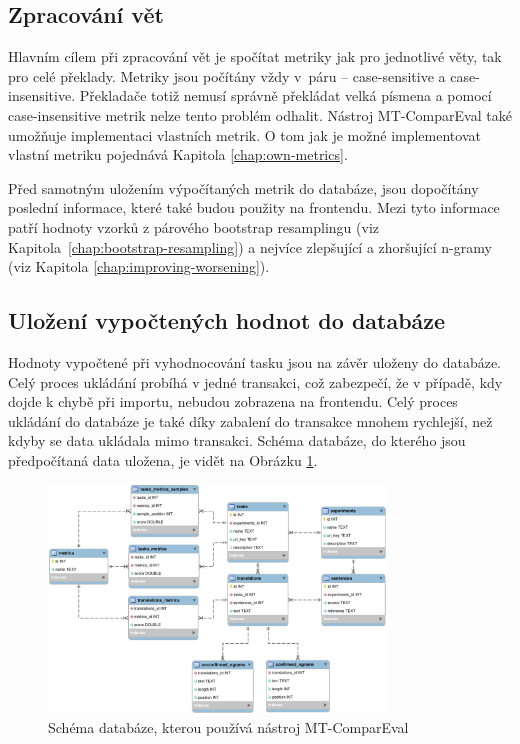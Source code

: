 \subsection{Zpracování vět}
Hlavním cílem při zpracování vět je spočítat metriky jak pro jednotlivé věty,
  tak pro celé překlady.
Metriky jsou počítány vždy v~páru -- \mbox{case-sensitive} a \mbox{case-insensitive}.
Překladače totiž nemusí správně překládat velká písmena
  a pomocí \mbox{case-insensitive} metrik nelze tento problém odhalit.
Nástroj \mbox{MT-ComparEval} také umožňuje implementaci vlastních metrik.
O tom jak je možné implementovat vlastní metriku pojednává Kapitola \ref{chap:own-metrics}.

Před samotným uložením výpočítaných metrik do databáze,
  jsou dopočítány poslední informace,
  které také budou použity na frontendu.
Mezi tyto informace patří hodnoty vzorků z párového bootstrap resamplingu (viz Kapitola~\ref{chap:bootstrap-resampling})
  a nejvíce zlepšující a zhoršující \mbox{n-gramy} (viz Kapitola \ref{chap:improving-worsening}).

\subsection{Uložení vypočtených hodnot do databáze}
Hodnoty vypočtené při vyhodnocování tasku jsou na závěr uloženy do databáze.
Celý proces ukládání probíhá v jedné transakci,
  což zabezpečí, že v případě, kdy dojde k chybě při importu, nebudou zobrazena na frontendu.
Celý proces ukládání do databáze je také díky zabalení do transakce mnohem rychlejší,
  než kdyby se data ukládala mimo transakci.
Schéma databáze, do kterého jsou předpočítaná data uložena, je vidět na Obrázku \ref{img:schema}.
\begin{figure}
	\center
	\includegraphics[width=0.8\textwidth]{img/schema.eps}
	\caption{Schéma databáze, kterou používá nástroj \mbox{MT-ComparEval}}
	\label{img:schema}
\end{figure}

